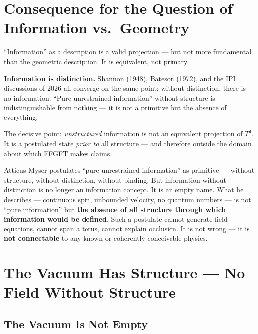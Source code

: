 \section{Consequence for the Question of Information vs.\ Geometry}

``Information'' as a description is a valid projection --- but not more fundamental than the geometric description. It is equivalent, not primary.

\begin{keyresult}
\textbf{Information is distinction.} Shannon (1948), Bateson (1972), and the IPI discussions of 2026 \cite{Kriger2026} all converge on the same point: without distinction, there is no information. ``Pure unrestrained information'' without structure is indistinguishable from nothing --- it is not a primitive but the absence of everything.
\end{keyresult}

The decisive point: \emph{unstructured} information is not an equivalent projection of $T^4$. It is a postulated state \emph{prior to} all structure --- and therefore outside the domain about which FFGFT makes claims.

\begin{erkenntnis}
Atticus Myser postulates ``pure unrestrained information'' as primitive --- without structure, without distinction, without binding. But information without distinction is no longer an information concept. It is an empty name. What he describes --- continuous spin, unbounded velocity, no quantum numbers --- is not ``pure information'' but \textbf{the absence of all structure through which information would be defined}. Such a postulate cannot generate field equations, cannot span a torus, cannot explain occlusion. It is not wrong --- it is \textbf{not connectable} to any known or coherently conceivable physics.
\end{erkenntnis}

\section{The Vacuum Has Structure --- No Field Without Structure}

\subsection{The Vacuum Is Not Empty}


